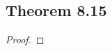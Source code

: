 \documentclass[../../main.tex]{subfiles}
\begin{document}
\subsection{Theorem 8.15}
\begin{wts}

\end{wts}
\begin{proof}

\end{proof}
\end{document}
